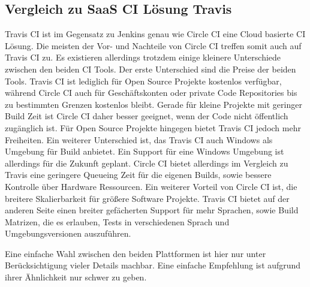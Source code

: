 \documentclass[11pt]{article}
\begin{document}
\subsection {Vergleich zu SaaS CI Lösung Travis}
Travis CI ist im Gegensatz zu Jenkins genau wie Circle CI eine Cloud basierte CI Lösung. Die meisten der Vor- und Nachteile von Circle CI treffen somit auch auf Travis CI zu. Es existieren allerdings trotzdem einige kleinere Unterschiede zwischen den beiden CI Tools. Der erste Unterschied sind die Preise der beiden Tools. Travis CI ist lediglich für Open Source Projekte kostenlos verfügbar, während Circle CI auch für Geschäftskonten oder private Code Repositories bis zu bestimmten Grenzen kostenlos bleibt. Gerade für kleine Projekte mit geringer Build Zeit ist Circle CI daher besser geeignet, wenn der Code nicht öffentlich zugänglich ist. Für Open Source Projekte hingegen bietet Travis CI jedoch mehr Freiheiten. Ein weiterer Unterschied ist, das Travis CI auch Windows als Umgebung für Build anbietet. Ein Support für eine Windows Umgebung ist allerdings für die Zukunft geplant.
Circle CI bietet allerdings im Vergleich zu Travis eine geringere Queueing Zeit für die eigenen Builds, sowie bessere Kontrolle über Hardware Ressourcen. Ein weiterer Vorteil von Circle CI ist, die breitere Skalierbarkeit für größere Software Projekte.
Travis CI bietet auf der anderen Seite einen breiter gefächerten Support für mehr Sprachen, sowie Build Matrizen, die es erlauben, Tests in verschiedenen Sprach und Umgebungsversionen auszuführen.

Eine einfache Wahl zwischen den beiden Plattformen ist hier nur unter Berücksichtigung vieler Details machbar. Eine einfache Empfehlung ist aufgrund ihrer Ähnlichkeit nur schwer zu geben.
\end{document}
